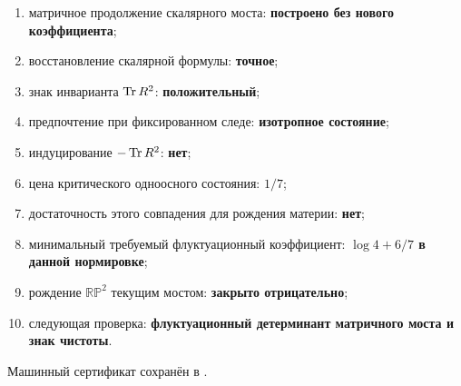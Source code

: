 \begin{protocol}
\begin{enumerate}
 \item матричное продолжение скалярного моста:
 \textbf{построено без нового коэффициента};
 \item восстановление скалярной формулы:
 \textbf{точное};
 \item знак инварианта $\operatorname{Tr} R^2$:
 \textbf{положительный};
 \item предпочтение при фиксированном следе:
 \textbf{изотропное состояние};
 \item индуцирование $-\operatorname{Tr} R^2$:
 \textbf{нет};
 \item цена критического одноосного состояния:
 \textbf{$1/7$};
 \item достаточность этого совпадения для рождения материи:
 \textbf{нет};
 \item минимальный требуемый флуктуационный коэффициент:
 \textbf{$\log4+6/7$ в данной нормировке};
 \item рождение $\mathbb{RP}^2$ текущим мостом:
 \textbf{закрыто отрицательно};
 \item следующая проверка:
 \textbf{флуктуационный детерминант матричного моста и знак чистоты}.
\end{enumerate}
\end{protocol}

Машинный сертификат сохранён в
.